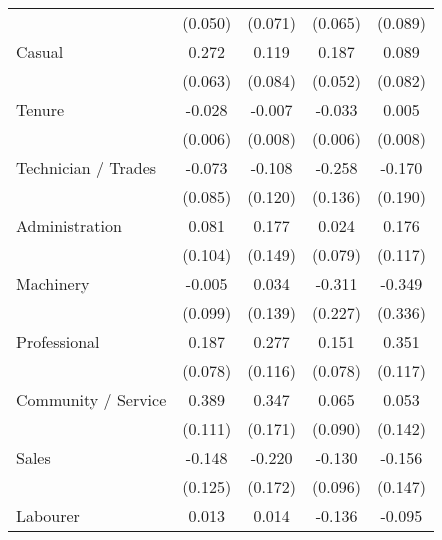 {\begin{tabular}{l*{4}{c}}
                    &     (0.050)         &     (0.071)         &     (0.065)         &     (0.089)         \\
Casual              &       0.272\sym{***}&       0.119         &       0.187\sym{***}&       0.089         \\
                    &     (0.063)         &     (0.084)         &     (0.052)         &     (0.082)         \\
Tenure              &      -0.028\sym{***}&      -0.007         &      -0.033\sym{***}&       0.005         \\
                    &     (0.006)         &     (0.008)         &     (0.006)         &     (0.008)         \\
Technician / Trades &      -0.073         &      -0.108         &      -0.258\sym{*}  &      -0.170         \\
                    &     (0.085)         &     (0.120)         &     (0.136)         &     (0.190)         \\
Administration      &       0.081         &       0.177         &       0.024         &       0.176         \\
                    &     (0.104)         &     (0.149)         &     (0.079)         &     (0.117)         \\
Machinery           &      -0.005         &       0.034         &      -0.311         &      -0.349         \\
                    &     (0.099)         &     (0.139)         &     (0.227)         &     (0.336)         \\
Professional        &       0.187\sym{**} &       0.277\sym{**} &       0.151\sym{*}  &       0.351\sym{***}\\
                    &     (0.078)         &     (0.116)         &     (0.078)         &     (0.117)         \\
Community / Service &       0.389\sym{***}&       0.347\sym{**} &       0.065         &       0.053         \\
                    &     (0.111)         &     (0.171)         &     (0.090)         &     (0.142)         \\
Sales               &      -0.148         &      -0.220         &      -0.130         &      -0.156         \\
                    &     (0.125)         &     (0.172)         &     (0.096)         &     (0.147)         \\
Labourer            &       0.013         &       0.014         &      -0.136         &      -0.095         \\

\end{tabular}}
